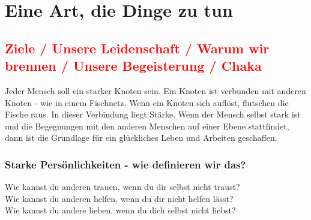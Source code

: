 \chapter{Eine Art, die Dinge zu tun}
  \section{\textcolor{red}{Ziele / Unsere Leidenschaft / Warum wir brennen / Unsere Begeisterung / Chaka}}
Jeder Mensch soll ein starker Knoten sein. Ein Knoten ist verbunden mit anderen Knoten - wie in einem Fischnetz. Wenn ein Knoten sich auflöst, flutschen die Fische raus.
%
In dieser Verbindung liegt Stärke.
%
Wenn der Mensch selbst stark ist und die Begegnungen mit den anderen Menschen auf einer Ebene stattfindet, dann ist die Grundlage für ein glückliches Leben und Arbeiten geschaffen.
    \subsection{Starke Persönlichkeiten - wie definieren wir das?}
Wie kannst du anderen trauen, wenn du dir selbst nicht traust?\\
Wie kannst du anderen helfen, wenn du dir nicht helfen lässt?\\
Wie kannst du andere lieben, wenn du dich selbst nicht liebst?\\

